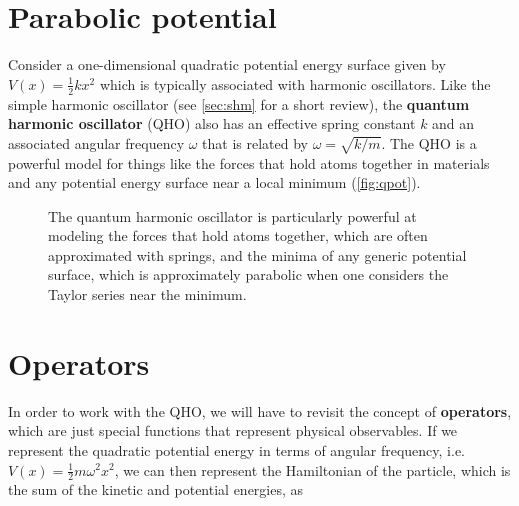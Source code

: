 \section{Parabolic potential}

Consider a one-dimensional quadratic potential energy surface given by $V(x) = \frac{1}{2} kx^2$ which is typically associated with harmonic oscillators. 
Like the simple harmonic oscillator (see \autoref{sec:shm} for a short review), the \textbf{quantum harmonic oscillator} (QHO) also has an effective spring constant $k$ and an associated angular frequency $\omega$ that is related by $\omega = \sqrt{k/m}$. 
The QHO is a powerful model for things like the forces that hold atoms together in materials and any potential energy surface near a local minimum (\autoref{fig:qpot}).

\begin{figure}[!h]
	\centering
	 \hspace{4ex}
	\caption{The quantum harmonic oscillator is particularly powerful at modeling \protect{} the forces that hold atoms together, which are often approximated with springs, and 
	\protect{} the minima of any generic potential surface, which is approximately parabolic when one considers the Taylor series near the minimum.}
	\label{fig:qpot}
\end{figure}



\section{Operators}

In order to work with the QHO, we will have to revisit the concept of \textbf{operators}, which are just special functions that represent physical observables. 
If we represent the quadratic potential energy in terms of angular frequency, i.e. $V(x) = \frac{1}{2} m\omega^2x^2$, we can then represent the Hamiltonian of the particle, which is the sum of the kinetic and potential energies, as

